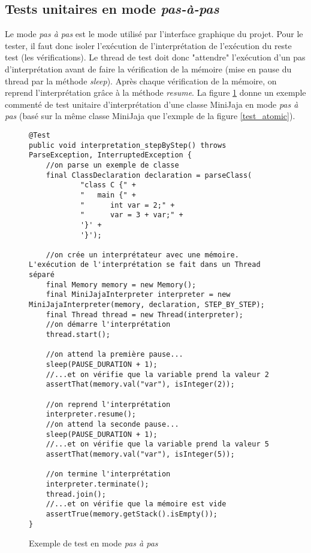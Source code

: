 \documentclass[a4paper,12pt]{article}
\begin{document}
\subsection{Tests unitaires en mode \emph{pas-à-pas}}

Le mode \emph{pas à pas} est le mode utilisé par l'interface graphique du projet. Pour le tester, il faut donc isoler l'exécution de l'interprétation de l'exécution du reste test (les vérifications). 
Le thread de test doit donc "attendre" l'exécution d'un pas d'interprétation avant de faire la vérification de la mémoire (mise en pause du thread par la méthode \emph{sleep}).
Après chaque vérification de la mémoire, on reprend l'interprétation grâce à la méthode \emph{resume}.
La figure \ref{test_stepByStep} donne un exemple commenté de test unitaire d'interprétation d'une classe MiniJaja en mode \emph{pas à pas} (basé sur la même classe MiniJaja que l'exmple de la figure \ref{test_atomic}).

\begin{figure}[!ht]
\begin{lstlisting}
@Test
public void interpretation_stepByStep() throws ParseException, InterruptedException {
    //on parse un exemple de classe
    final ClassDeclaration declaration = parseClass(
            "class C {" +
            "   main {" +
            "      int var = 2;" +
            "      var = 3 + var;" +
            '}' +
            '}');

    //on crée un interprétateur avec une mémoire. L'exécution de l'interprétation se fait dans un Thread séparé
    final Memory memory = new Memory();
    final MiniJajaInterpreter interpreter = new MiniJajaInterpreter(memory, declaration, STEP_BY_STEP);
    final Thread thread = new Thread(interpreter);
    //on démarre l'interprétation
    thread.start();

    //on attend la première pause...
    sleep(PAUSE_DURATION + 1);
    //...et on vérifie que la variable prend la valeur 2
    assertThat(memory.val("var"), isInteger(2));

    //on reprend l'interprétation
    interpreter.resume();
    //on attend la seconde pause...
    sleep(PAUSE_DURATION + 1);
    //...et on vérifie que la variable prend la valeur 5
    assertThat(memory.val("var"), isInteger(5));

    //on termine l'interprétation
    interpreter.terminate();
    thread.join();
    //...et on vérifie que la mémoire est vide
    assertTrue(memory.getStack().isEmpty());
}
\end{lstlisting}
\caption{Exemple de test en mode \emph{pas à pas}}
\label{test_stepByStep}
\end{figure}
\end{document}
